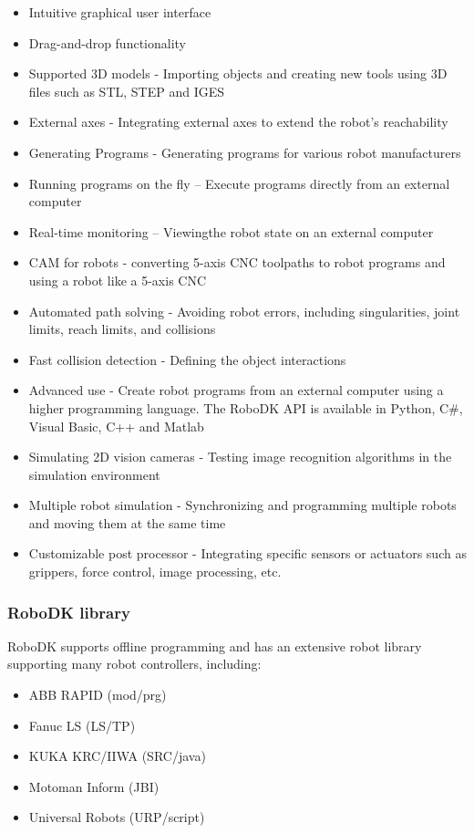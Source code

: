 \begin{itemize}
\item Intuitive graphical user interface
\item Drag-and-drop functionality 
\item Supported 3D models - Importing objects and creating new tools using 3D files such as STL, STEP and IGES
\item External axes - Integrating external axes to extend the robot’s reachability
\item Generating Programs - Generating programs for various robot manufacturers
\item Running programs on the fly – Execute programs directly from an external computer
\item Real-time monitoring – Viewingthe robot state on an external computer 
\item CAM for robots - converting 5-axis CNC toolpaths to robot programs and using a robot like a 5-axis CNC
\item Automated path solving - Avoiding robot errors, including singularities, joint limits, reach limits, and collisions
\item Fast collision detection - Defining the object interactions 
\item Advanced use - Create robot programs from an external computer using a higher programming language. The RoboDK API is available in Python, C#, Visual Basic, C++ and Matlab
\item Simulating 2D vision cameras - Testing image recognition algorithms in the simulation environment
\item Multiple robot simulation - Synchronizing and programming multiple robots and moving them at the same time 
\item Customizable post processor - Integrating specific sensors or actuators such as grippers, force control, image processing, etc.
\end{itemize}

\subsubsection*{RoboDK library}

RoboDK supports offline programming and has an extensive robot library supporting many robot controllers, including:

\begin{itemize}
    \item ABB RAPID (mod/prg)
    \item Fanuc LS (LS/TP)
    \item KUKA KRC/IIWA (SRC/java)
    \item Motoman Inform (JBI)
    \item Universal Robots (URP/script)
\end{itemize}

